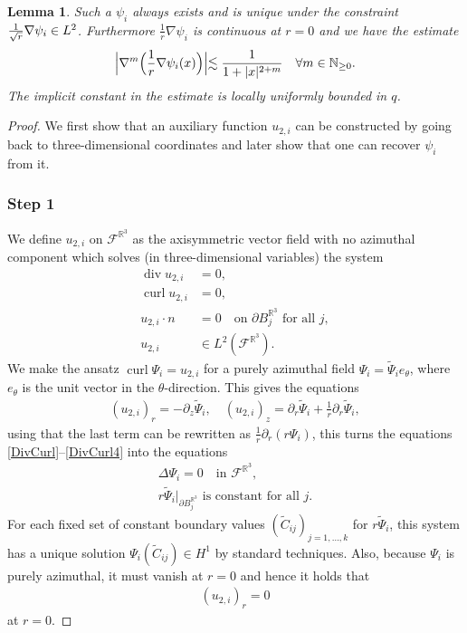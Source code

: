 \documentclass[10pt]{amsart}
\newtheorem{lemma}[theorem]{Lemma}
\theoremstyle{definition}
\renewcommand{\div}{\operatorname{div}}
\DeclareMathOperator{\curl}{curl}
\newcommand\R{\mathbb{R}}
\newcommand\N{\mathbb{N}}
\newcommand\eq{=}
\let\de\partial
\begin{document}
\endgroup

\begin{lemma}\label{ExistencePsi}
Such a $\psi_i$ always exists and is unique under the constraint $\frac{1}{\sqrt{r}}\nabla\psi_i\in\nobreak L^2$. Furthermore $\frac{1}{r}\nabla\psi_i$ is continuous at $r=0$ and we have the estimate\vspace*{-3pt}
\begin{align*}
\Bigl|\nabla^m\Bigl(\frac{1}{r}\nabla\psi_i(x)\Bigr)\Bigl|\lesssim\frac{1}{1+|x|^{2+m}}\quad \forall m\in\N_{\geq 0}.
\end{align*}
The implicit constant in the estimate is locally uniformly bounded in $q$.
\end{lemma}
\begin{proof}
We first show that an auxiliary function $u_{2,i}$ can be constructed by going back to three-dimensional coordinates and later show that one can recover $\psi_i$ from it.

\subsubsection*{Step 1}
We define $u_{2,i}$ on $\mathcal{F}^{\R^3}$ as the axisymmetric vector field with no azimuthal component which solves (in three-dimensional variables) the system
\begin{align}
\div u_{2,i}&\eq0,\label{DivCurl}\\[-3pt]
 \curl u_{2,i}&\eq0,\label{DivCurl3}\\[-3pt]
 u_{2,i}\cdot n&\eq0\label{DivCurl4}\quad\text{on $\de B_j^{\R^3}$ for all $j$},\\[-3pt]
 u_{2,i}&\in L^2(\mathcal{F}^{\R^3}).\label{DivCurl5}
\end{align}
We make the ansatz $\curl \Psi_i=u_{2,i}$ for a purely azimuthal field $\Psi_i=\tilde{\Psi}_ie_\theta$, where $e_\theta$ is the unit vector in the $\theta$-direction.
This gives the equations
\begin{align*}
(u_{2,i})_r\eq-\de_z\tilde{\Psi}_i,\quad (u_{2,i})_z\eq\de_r\tilde{\Psi}_i+\frac{1}{r}\de_r \tilde{\Psi}_i,
\end{align*}
using that the last term can be rewritten as $\frac{1}{r}\de_r(r\Psi_i)$, this turns the equations \eqref{DivCurl}--\eqref{DivCurl4} into the equations
\begin{gather}
\Delta \Psi_i\eq0\quad\text{in $\mathcal{F}^{\R^3}$},\label{BigPhi1}\\[-3pt]
r\tilde{\Psi}_i|_{\de B_j^{\R^3}}\text{ is constant for all $j$.}\label{BigPhi2}
\end{gather}
For each fixed set of constant boundary values $(\tilde{C}_{ij})_{j=1,\dots,k}$ for $r\tilde{\Psi}_i$, this system has a unique solution $\Psi_i(\tilde{C}_{ij})\in H^1$ by standard techniques. Also, because $\Psi_i$ is purely azimuthal, it must vanish at $r=0$ and hence it holds that\vspace*{-3pt}
\begin{align}\label{u at 0}
(u_{2,i})_r\eq0
\end{align}
at $r=0$.


\end{proof}
\end{document}
